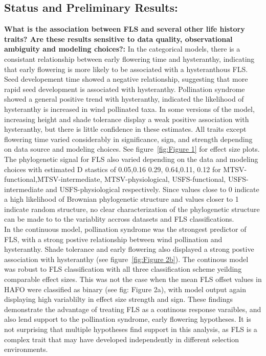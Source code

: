 \documentclass{article}\usepackage[]{graphicx}\usepackage[]{color}
\begin{document}
\subsection*{Status and Preliminary Results:}
\indent\indent\textbf{What is the association between FLS and several other life history traits?  Are these results sensitive to data quality, observational ambiguity and modeling choices?:} In the categorical models, there is a consistant relationship between early flowering time and hysteranthy, indicating that early flowering is more likely to be associated with a hysteranthous FLS. Seed developement time showed a negative relationship, suggesting that more rapid seed development is associated with hysteranthy. Pollination syndrome showed a general positive trend with hysteranthy, indicated the likelihood of hysteranthy is increased in wind pollinated taxa. In some versions of the model, increasing height and shade tolerance display a weak positive association with hysteranthy, but there is little confidence in these estimates. All traits except flowering time varied considerably in significance, sign, and strength depending on data source and modeling choices. See figure~\ref{fig:Figure 1} for effect size plots.\\
\indent The phylogenetic signal for FLS also varied depending on the data and modeling choices with estimated D stastics of 0.05,0.16 0.29, 0.64,0.11, 0.12 for MTSV-functional,MTSV-intermediate, MTSV-physiological, USFS-functional, USFS-intermediate and USFS-physiological respectively. Since values close to 0 indicate a high likelihood of Brownian phylogenetic structure and values closer to 1 indicate random structure, no clear characterization of the phylogenetic structure can be made to to the variablity accross datasets and FLS classifications. \\
\indent In the continuous model, pollination syndrome was the strongest predictor of FLS, with a strong postive relationship between wind pollination and hysteranthy. Shade tolerance and early flowering also displayed a strong postive association with hysteranthy (see figure~\ref{fig:Figure 2b}). The continous model was robust to FLS classification with all three classification scheme yeilding comparable effect sizes. This was not the case when the mean FLS offset values in HAFO were classified as binary (see fig: Figure 2a), with model output again displaying high variablilty in effect size strength and sign. These findings demonstrate the advantage of treating FLS as a continous response varaibles, and also lend support to the pollination syndrome, early flowering hypotheses. It is not surprising that multiple hypotheses find support in this analysis, as FLS is a complex trait that may have developed independently in different selection environments.
\end{document}
